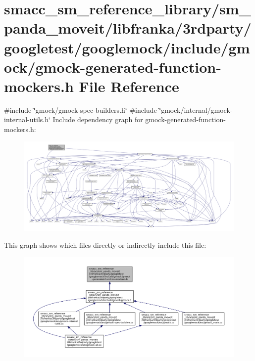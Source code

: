 \hypertarget{gmock-generated-function-mockers_8h}{}\section{smacc\+\_\+sm\+\_\+reference\+\_\+library/sm\+\_\+panda\+\_\+moveit/libfranka/3rdparty/googletest/googlemock/include/gmock/gmock-\/generated-\/function-\/mockers.h File Reference}
\label{gmock-generated-function-mockers_8h}
{\ttfamily \#include \char`\"{}gmock/gmock-\/spec-\/builders.\+h\char`\"{}}\newline
{\ttfamily \#include \char`\"{}gmock/internal/gmock-\/internal-\/utils.\+h\char`\"{}}\newline
Include dependency graph for gmock-\/generated-\/function-\/mockers.h\+:
\nopagebreak
\begin{figure}[H]
\begin{center}
\leavevmode
\includegraphics[width=350pt]{gmock-generated-function-mockers_8h__incl}
\end{center}
\end{figure}
This graph shows which files directly or indirectly include this file\+:
\nopagebreak
\begin{figure}[H]
\begin{center}
\leavevmode
\includegraphics[width=350pt]{gmock-generated-function-mockers_8h__dep__incl}
\end{center}
\end{figure}
